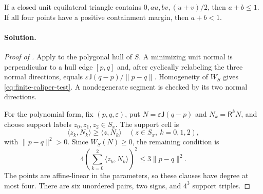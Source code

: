 \begin{lemma}
\label{lem:app-midpoint-caliper}
If a closed unit equilateral triangle contains
$0,au,bv,(u+v)/2$, then $a+b\le1$.  If all four points have a positive
containment margin, then $a+b<1$.
\end{lemma}

\paragraph{Solution.}

\begin{proof}[Proof of ]
Apply  to the polygonal hull of $S$.
A minimizing unit normal is perpendicular to a hull edge $[p,q]$ and, after
cyclically relabeling the three normal directions, equals
$\varepsilon\mathsf J(q-p)/\lVert p-q\rVert$.  Homogeneity of $W_S$ gives
\eqref{eq:finite-caliper-test}.  A nondegenerate segment is checked by its two
normal directions.

For the polynomial form, fix $(p,q,\varepsilon)$, put
$N=\varepsilon\mathsf J(q-p)$ and $N_k=\mathsf R^kN$, and choose support
labels $z_0,z_1,z_2\in S_x$.  The support cell is
\begin{equation}
 \langle z_k,N_k\rangle\ge\langle z,N_k\rangle
 \quad(z\in S_x,\ k=0,1,2),
 \label{eq:caliper-cell}
\end{equation}
with $\lVert p-q\rVert^2>0$.  Since $W_S(N)\ge0$, the remaining condition is
\begin{equation}
 4\left(\sum_{k=0}^2\langle z_k,N_k\rangle\right)^2
 \le3\lVert p-q\rVert^2.
 \label{eq:caliper-cell-polynomial}
\end{equation}
The points are affine-linear in the parameters, so these clauses have degree
at most four.  There are six unordered pairs, two signs, and $4^3$ support
triples.
\end{proof}

